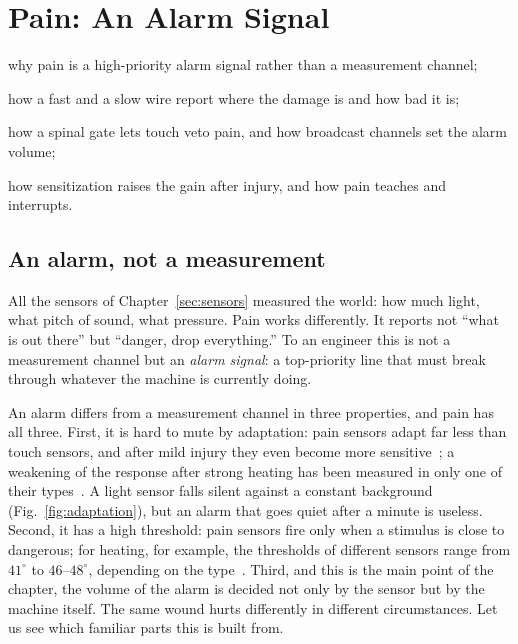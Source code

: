 \chapter{Pain: An Alarm Signal}
\label{sec:pain}
\begin{chaptergoals}
\item why pain is a high-priority alarm signal rather than a measurement channel;
\item how a fast and a slow wire report where the damage is and how bad it is;
\item how a spinal gate lets touch veto pain, and how broadcast channels set the alarm volume;
\item how sensitization raises the gain after injury, and how pain teaches and interrupts.
\end{chaptergoals}

\section{An alarm, not a measurement}

All the sensors of Chapter~\ref{sec:sensors} measured the world: how much light, what pitch of sound, what pressure. Pain works differently. It reports not ``what is out there'' but ``danger, drop everything.'' To an engineer this is not a measurement channel but an \emph{alarm signal}: a top-priority line that must break through whatever the machine is currently doing.

An alarm differs from a measurement channel in three properties, and pain has all three. First, it is hard to mute by adaptation: pain sensors adapt far less than touch sensors, and after mild injury they even become more sensitive~\cite{LaMotte1982hyper}; a weakening of the response after strong heating has been measured in only one of their types~\cite{Treede1995heat}. A light sensor falls silent against a constant background (Fig.~\ref{fig:adaptation}), but an alarm that goes quiet after a minute is useless. Second, it has a high threshold: pain sensors fire only when a stimulus is close to dangerous; for heating, for example, the thresholds of different sensors range from $41^\circ$ to $46$--$48^\circ$, depending on the type~\cite{Treede1995heat, Weidner1999cfib}. Third, and this is the main point of the chapter, the volume of the alarm is decided not only by the sensor but by the machine itself. The same wound hurts differently in different circumstances. Let us see which familiar parts this is built from.

